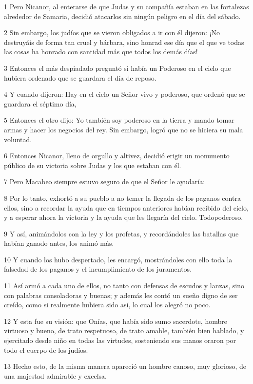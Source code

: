 \par 1 Pero Nicanor, al enterarse de que Judas y su compañía estaban en las fortalezas alrededor de Samaria, decidió atacarlos sin ningún peligro en el día del sábado.
\par 2 Sin embargo, los judíos que se vieron obligados a ir con él dijeron: ¡No destruyáis de forma tan cruel y bárbara, sino honrad ese día que el que ve todas las cosas ha honrado con santidad más que todos los demás días!
\par 3 Entonces el más despiadado preguntó si había un Poderoso en el cielo que hubiera ordenado que se guardara el día de reposo.
\par 4 Y cuando dijeron: Hay en el cielo un Señor vivo y poderoso, que ordenó que se guardara el séptimo día,
\par 5 Entonces el otro dijo: Yo también soy poderoso en la tierra y mando tomar armas y hacer los negocios del rey. Sin embargo, logró que no se hiciera su mala voluntad.
\par 6 Entonces Nicanor, lleno de orgullo y altivez, decidió erigir un monumento público de su victoria sobre Judas y los que estaban con él.
\par 7 Pero Macabeo siempre estuvo seguro de que el Señor le ayudaría:
\par 8 Por lo tanto, exhortó a su pueblo a no temer la llegada de los paganos contra ellos, sino a recordar la ayuda que en tiempos anteriores habían recibido del cielo, y a esperar ahora la victoria y la ayuda que les llegaría del cielo. Todopoderoso.
\par 9 Y así, animándolos con la ley y los profetas, y recordándoles las batallas que habían ganado antes, los animó más.
\par 10 Y cuando los hubo despertado, les encargó, mostrándoles con ello toda la falsedad de los paganos y el incumplimiento de los juramentos.
\par 11 Así armó a cada uno de ellos, no tanto con defensas de escudos y lanzas, sino con palabras consoladoras y buenas; y además les contó un sueño digno de ser creído, como si realmente hubiera sido así, lo cual los alegró no poco.
\par 12 Y esta fue su visión: que Onías, que había sido sumo sacerdote, hombre virtuoso y bueno, de trato respetuoso, de trato amable, también bien hablado, y ejercitado desde niño en todas las virtudes, sosteniendo sus manos oraron por todo el cuerpo de los judíos.
\par 13 Hecho esto, de la misma manera apareció un hombre canoso, muy glorioso, de una majestad admirable y excelsa.
